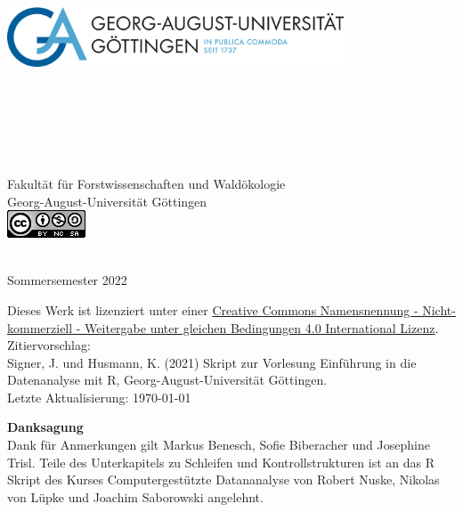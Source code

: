 \begin{titlepage}
\begin{center}
\vfill
\includegraphics[width=10cm,height=8cm]{misc/fig/logo-uni-neu.png}
~\\[0.4cm]

Fakultät für Forstwissenschaften und Waldökologie \\
Georg-August-Universität Göttingen \\[1.2cm]
\includegraphics{misc/fig/logo_cc.png}
\vfill

\hRule ~\\[0.5cm]
{\large Sommersemester 2022}\\


\end{center}
\newpage
\vspace*{\fill}
Dieses Werk ist lizenziert unter einer \href{https://creativecommons.org/licenses/by-nc-sa/4.0/}{Creative Commons Namensnennung - Nicht-kommerziell - Weitergabe unter gleichen Bedingungen 4.0 International Lizenz}. \\[1cm]
Zitiervorschlag: \\
Signer, J. und Husmann, K. (2021) Skript zur Vorlesung Einführung in die Datenanalyse mit R, Georg-August-Universität Göttingen.
~\\[1cm]
Letzte Aktualisierung: \today

\newpage

{\bf Danksagung} \\[0.5cm]

Dank für Anmerkungen gilt Markus Benesch, Sofie Biberacher und Josephine Trisl.
Teile des Unterkapitels zu Schleifen und Kontrollstrukturen ist an das R Skript des Kurses Computergestützte Datananalyse von Robert Nuske, Nikolas von Lüpke und Joachim Saborowski angelehnt.
\end{titlepage}

